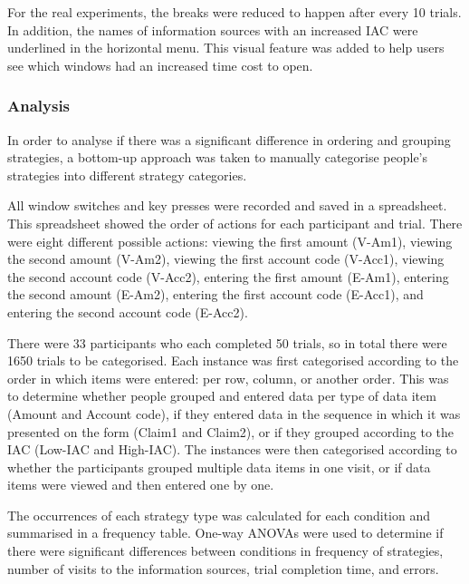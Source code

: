 \begin{table}
\begin{itemize}
For the real experiments, the breaks were reduced to happen after every 10 trials. In addition, the names of information sources with an increased IAC were underlined in the horizontal menu. This visual feature was added to help users see which windows had an increased time cost to open.

\subsubsection{Analysis}
In order to analyse if there was a significant difference in ordering and grouping strategies, a bottom-up approach was taken to manually categorise people's strategies into different strategy categories.

All window switches and key presses were recorded and saved in a spreadsheet. This spreadsheet showed the order of actions for each participant and trial. There were eight different possible actions: viewing the first amount (V-Am1), viewing the second amount (V-Am2), viewing the first account code (V-Acc1), viewing the second account code (V-Acc2), entering the first amount (E-Am1), entering the second amount (E-Am2), entering the first account code (E-Acc1), and entering the second account code (E-Acc2).

There were 33 participants who each completed 50 trials, so in total there were 1650 trials to be categorised. Each instance was first categorised according to the order in which items were entered: per row, column, or another order. This was to determine whether people grouped and entered data per type of data item (Amount and Account code), if they entered data in the sequence in which it was presented on the form (Claim1 and Claim2), or if they grouped according to the IAC (Low-IAC and High-IAC). The instances were then categorised according to whether the participants grouped multiple data items in one visit, or if data items were viewed and then entered one by one. 

The occurrences of each strategy type was calculated for each condition and summarised in a frequency table. One-way ANOVAs were used to determine if there were significant differences between conditions in frequency of strategies, number of visits to the information sources, trial completion time, and errors. 



\end{itemize}
\end{table}
